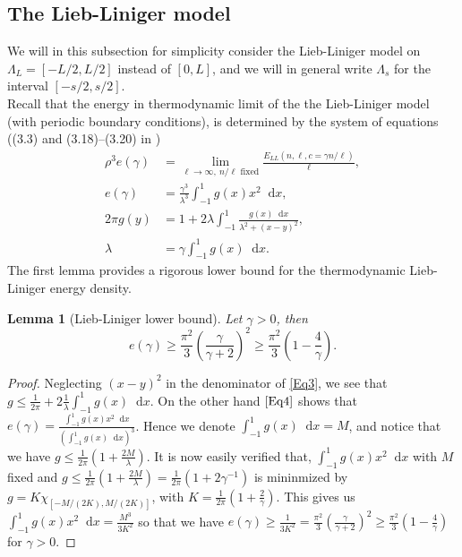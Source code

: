 \documentclass[a4paper,11pt]{article}
\newcommand*\diff{\mathop{}\!\mathrm{d}}
\newtheorem{lemma}[theorem]{Lemma}
\numberwithin{equation}{section}
\begin{document}
	\subsection{The Lieb-Liniger model}
	We will in this subsection for simplicity consider the Lieb-Liniger model on $ \Lambda_L=[-L/2,L/2] $ instead of $ [0,L] $, and we will in general write $ \Lambda_s $ for the interval $ [-s/2,s/2] $.\\
	Recall that the energy in thermodynamic limit of the the Lieb-Liniger model (with periodic boundary conditions), is determined by the system of equations ((3.3) and (3.18)--(3.20) in \cite{PhysRev.130.1605})
	\begin{align}
	\rho^3 e(\gamma)&=\lim\limits_{\ell\to\infty,\ n/\ell\text{ fixed}}\frac{E_{LL}(n,\ell,c=\gamma n/\ell)}{\ell},\label{Eq1}\\
	e(\gamma)&=\frac{\gamma^3}{\lambda^3}\int_{-1}^{1}g(x)x^2\diff x,\label{Eq2}\\
	2\pi g(y)&=1+2\lambda\int_{-1}^{1}\frac{g(x)\diff x}{\lambda^2+(x-y)^2},\label{Eq3}\\
	\lambda&=\gamma\int_{-1}^{1}g(x)\diff x.\label{Eq4}
	\end{align}
	The first lemma provides a rigorous lower bound for the thermodynamic Lieb-Liniger energy density. 
	\begin{lemma}[Lieb-Liniger lower bound] \label{LemmaLL-LowerBound}
		Let $ \gamma>0 $, then
		\begin{equation}
		e(\gamma)\geq \frac{\pi^2}{3}\left(\frac{\gamma}{\gamma+2}\right)^2\geq \frac{\pi^2}{3}\left(1-\frac{4}{\gamma}\right).
		\end{equation}
	\end{lemma}
	\begin{proof}
		Neglecting $ (x-y)^2 $ in the denominator of \eqref{Eq3}, we see that $ g\leq \frac{1}{2\pi}+2\frac{1}{\lambda}\int_{-1}^{1}g(x)\diff x $. On the other hand $ \eqref{Eq4} $ shows that $ e(\gamma)=\frac{\int_{-1}^{1}g(x)x^2\diff x}{\left(\int_{-1}^{1}g(x)\diff x\right)^3} $. Hence we denote $ \int_{-1}^{1}g(x)\diff x=M $, and notice that we have $ g\leq \frac{1}{2\pi}\left(1+\frac{2M}{\lambda}\right) $. It is now easily verified that, $ \int_{-1}^{1}g(x)x^2\diff x $ with $ M $ fixed and $ g\leq \frac{1}{2\pi}\left(1+\frac{2M}{\lambda}\right)=\frac{1}{2\pi}\left(1+2\gamma^{-1}\right) $ is mininmized by $ g=K\chi_{[-M/(2K),M/(2K)]} $, with $ K=\frac{1}{2\pi}\left(1+\frac{2}{\gamma}\right) $. This gives us $ \int_{-1}^{1}g(x)x^2\diff x=\frac{M^3}{3K^2}$ so that we have $ e(\gamma)\geq \frac{1}{3K^2}=\frac{\pi^2}{3}\left(\frac{\gamma}{\gamma+2}\right)^2\geq \frac{\pi^2}{3}(1-\frac{4}{\gamma})$ for $ \gamma>0 $.
	\end{proof}
\end{document}

